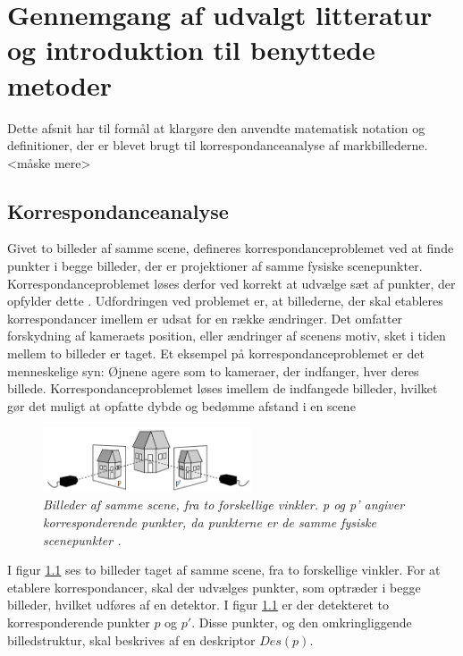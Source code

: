 \chapter{Gennemgang af udvalgt litteratur og introduktion til benyttede metoder} \label{sec:Kor}
Dette afsnit har til formål at klargøre den anvendte matematisk notation og definitioner, der er blevet brugt til korrespondanceanalyse af markbillederne.<måske mere>

\section{Korrespondanceanalyse}
Givet to billeder af samme scene, defineres korrespondanceproblemet ved at finde punkter i begge billeder, der er projektioner af samme fysiske scenepunkter. Korrespondanceproblemet løses derfor ved korrekt at udvælge sæt af punkter, der opfylder dette \cite{Stefano}.  Udfordringen ved problemet er, at billederne, der skal etableres korrespondancer imellem er udsat for en række ændringer. Det omfatter forskydning af kameraets position, eller ændringer af scenens motiv, sket i tiden mellem to billeder er taget. Et eksempel på korrespondanceproblemet er det menneskelige syn: Øjnene agere som to kameraer, der indfanger, hver deres billede. Korrespondanceproblemet løses imellem de indfangede billeder, hvilket gør det muligt at opfatte dybde og bedømme afstand i en scene 
\begin{figure}[H]
    \centering
    \includegraphics[width=0.55\textwidth]{fig/3.png}
     \vspace{-1em}
    \begin{center}    
       \caption{{\footnotesize \textit{Billeder af samme scene, fra to forskellige vinkler. p og p' angiver korresponderende punkter, da punkterne er de samme fysiske scenepunkter \cite{kim}.}}}
    \label{fig:1}
     \end{center}
     \vspace{-2.5em}
  \end{figure} \noindent
I figur \ref{fig:1} ses to billeder taget af samme scene, fra to forskellige vinkler. For at etablere korrespondancer, skal der udvælges punkter, som optræder i begge billeder, hvilket udføres af en detektor. I figur \ref{fig:1} er der detekteret to korresponderende punkter $p$ og $p'$. Disse punkter, og den omkringliggende billedstruktur, skal beskrives af en deskriptor $Des(p)$. %
